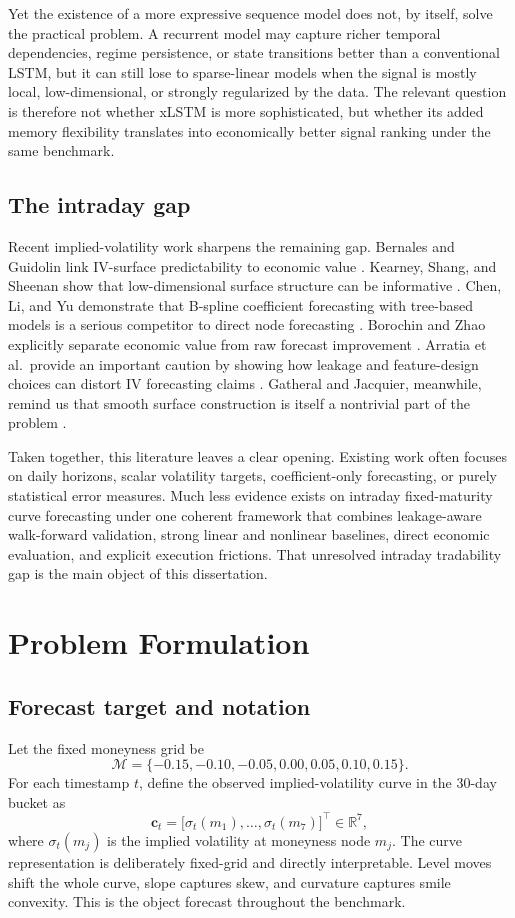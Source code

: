\documentclass[12pt]{report}
\begin{document}
Yet the existence of a more expressive sequence model does not, by itself, solve the practical problem. A recurrent model may capture richer temporal dependencies, regime persistence, or state transitions better than a conventional LSTM, but it can still lose to sparse-linear models when the signal is mostly local, low-dimensional, or strongly regularized by the data. The relevant question is therefore not whether xLSTM is more sophisticated, but whether its added memory flexibility translates into economically better signal ranking under the same benchmark.

\section{The intraday gap}
Recent implied-volatility work sharpens the remaining gap. Bernales and Guidolin link IV-surface predictability to economic value \citep{bernales2014}. Kearney, Shang, and Sheenan show that low-dimensional surface structure can be informative \citep{kearney2019}. Chen, Li, and Yu demonstrate that B-spline coefficient forecasting with tree-based models is a serious competitor to direct node forecasting \citep{chen2024bspline}. Borochin and Zhao explicitly separate economic value from raw forecast improvement \citep{borochin2025}. Arratia et al.\ provide an important caution by showing how leakage and feature-design choices can distort IV forecasting claims \citep{arratia2025}. Gatheral and Jacquier, meanwhile, remind us that smooth surface construction is itself a nontrivial part of the problem \citep{gatheral2014arbitrage}.

Taken together, this literature leaves a clear opening. Existing work often focuses on daily horizons, scalar volatility targets, coefficient-only forecasting, or purely statistical error measures. Much less evidence exists on intraday fixed-maturity curve forecasting under one coherent framework that combines leakage-aware walk-forward validation, strong linear and nonlinear baselines, direct economic evaluation, and explicit execution frictions. That unresolved intraday tradability gap is the main object of this dissertation.

\chapter{Problem Formulation}

\section{Forecast target and notation}
Let the fixed moneyness grid be
\[
\mathcal{M}=\{-0.15,-0.10,-0.05,0.00,0.05,0.10,0.15\}.
\]
For each timestamp \(t\), define the observed implied-volatility curve in the 30-day bucket as
\[
\mathbf{c}_t=\big[\sigma_t(m_1),\ldots,\sigma_t(m_7)\big]^\top \in \mathbb{R}^7,
\]
where \(\sigma_t(m_j)\) is the implied volatility at moneyness node \(m_j\). The curve representation is deliberately fixed-grid and directly interpretable. Level moves shift the whole curve, slope captures skew, and curvature captures smile convexity. This is the object forecast throughout the benchmark.
\end{document}
